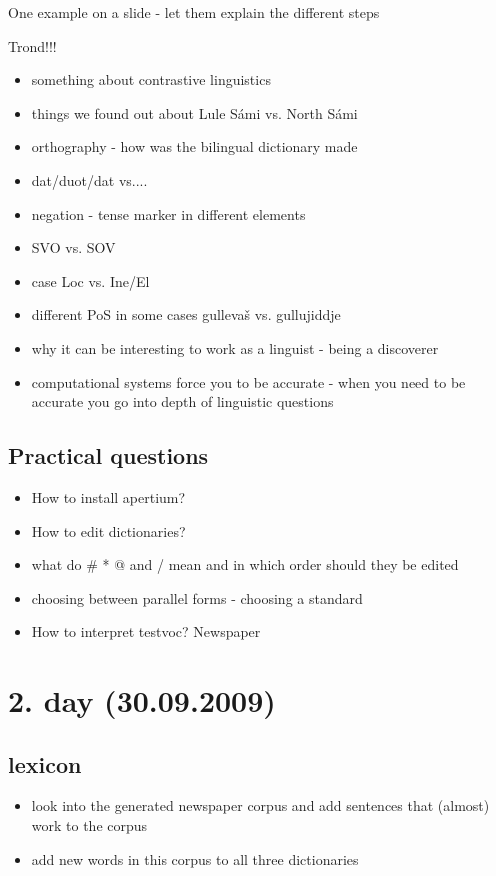 \documentclass[a4paper,english,12pt]{article}
\begin{document}
\begin{spacing}{1.0}
One example on a slide - let them explain the different steps


Trond!!!
\begin{itemize}
\item something about contrastive linguistics
\item things we found out about Lule Sámi vs. North Sámi
\item orthography - how was the bilingual dictionary made
\item dat/duot/dat vs....
\item negation - tense marker in different elements
\item SVO vs. SOV
\item case Loc vs. Ine/El
\item different PoS in some cases gullevaš vs. gullujiddje
\item why it can be interesting to work as a linguist - being a discoverer
\item computational systems force you to be accurate - when you need to be accurate you go into depth of linguistic questions
\end{itemize}


\subsection{Practical questions}

\begin{itemize}
\item How to install apertium?
\item    How to edit dictionaries?
\item what do # * @ and / mean and in which order should they be edited
\item choosing between parallel forms - choosing a standard
\item    How to interpret testvoc? Newspaper
\end{itemize}


\section{2. day (30.09.2009)}
\subsection{lexicon}
\begin{itemize}
\item look into the generated newspaper corpus and add sentences that (almost) work to the corpus
\item add new words in this corpus to all three dictionaries
\end{itemize}


\end{spacing}
\end{document}
